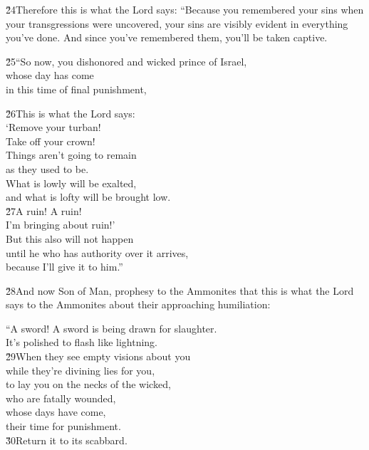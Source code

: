 \v{24}Therefore this is what the Lord  says: ``Because you remembered your sins when your transgressions were uncovered, your sins are visibly evident in everything you've done. And since you've remembered them, you'll be taken captive.

\begin{poetry}
\poeml \v{25}``So now, you dishonored and wicked prince of Israel, \\
\poemll    whose day has come \\
\poemlll       in this time of final punishment,
\end{poetry}

\begin{poetry}
\poeml \v{26}This is what the Lord  says: \\
\poeml `Remove your turban! \\
\poemll    Take off your crown! \\
\poeml Things aren't going to remain \\
\poemll    as they used to be. \\
\poeml What is lowly will be exalted, \\
\poemll    and what is lofty will be brought low. \\
\poeml \v{27}A ruin! A ruin! \\
\poemll    I'm bringing about ruin!' \\
\poeml But this also will not happen \\
\poemll    until he who has authority over it arrives, \\
\poemlll       because I'll give it to him.''
\end{poetry}

\v{28}And now Son of Man, prophesy to the Ammonites that this is what the Lord  says to the Ammonites about their approaching humiliation:

\begin{poetry}
\poeml ``A sword! A sword is being drawn for slaughter. \\
\poemll    It's polished to flash like lightning. \\
\poeml \v{29}When they see empty visions about you \\
\poemll    while they're divining lies for you, \\
\poeml to lay you on the necks of the wicked, \\
\poemll    who are fatally wounded, \\
\poeml whose days have come, \\
\poemll    their time for punishment. \\
\poeml \v{30}Return it to its scabbard.
\end{poetry}

